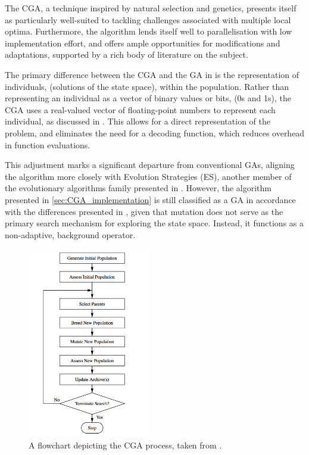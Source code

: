 \documentclass[10pt]{article}
\begin{document}
\begin{multicols}{2}
The CGA, a technique inspired by natural selection and genetics, presents itself as particularly well-suited to tackling challenges associated with multiple local optima. Furthermore, the algorithm lends itself well to parallelisation with low implementation effort, and offers ample opportunities for modifications and adaptations, supported by a rich body of literature on the subject.

The primary difference between the CGA and the GA in \cite{parks2023geneticalgorithms} is the representation of individuals, (solutions of the state space), within the population. Rather than representing an individual as a vector of binary values or bits, (0s and 1s), the CGA uses a real-valued vector of floating-point numbers to represent each individual, as discussed in \cite{PGA}. This allows for a direct representation of the problem, and eliminates the need for a decoding function, which reduces overhead in function evaluations.

This adjustment marks a significant departure from conventional GAs, aligning the algorithm more closely with Evolution Strategies (ES), another member of the evolutionary algorithms family presented in \cite{salimans2017evolution}. However, the algorithm presented in \ref{sec:CGA_implementation} is still classified as a GA in accordance with the differences presented in \cite{10.1007/BFb0029787}, given that mutation does not serve as the primary search mechanism for exploring the state space. Instead, it functions as a non-adaptive, background operator.

\begin{figure}[H]
    \centering
    \includegraphics[width=0.48\textwidth]{../figures/Ungenerated Images/Flowchart.png}
    \captionsetup{justification=centering}
    \caption{A flowchart depicting the CGA process, taken from \cite{parks2023geneticalgorithms}.}
    \label{fig:GAprocess}
\end{figure}


\end{multicols}
\end{document}
